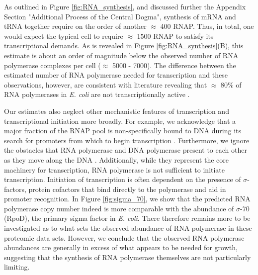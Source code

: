 As outlined in Figure \ref{fig:RNA_synthesis}, and discussed further the Appendix
Section "Additional Process of the Central Dogma", synthesis of mRNA and tRNA together require
on the order of another $\approx$ 400 RNAP. Thus, in total, one would expect the
typical cell to require $\approx$ 1500 RNAP to satisfy its transcriptional
demands. As is revealed in Figure \ref{fig:RNA_synthesis}(B), this estimate is about an
order of magnitude below the observed number of RNA polymerase complexes per
cell ($\approx$ 5000 - 7000). The difference between the estimated number of
RNA polymerase needed for transcription and these observations, however, are
consistent with literature revealing that $\approx$ 80\% of RNA
polymerases in \textit{E. coli} are not transcriptionally active
\citep{patrick2015}.

Our estimates also neglect other mechanistic features of transcription and
transcriptional initiation more broadly. For example, we acknowledge that a
major fraction of the RNAP pool is non-specifically bound to DNA during its
search for promoters from which to begin transcription \citep{klumpp2008}.
Furthermore, we ignore the obstacles that RNA polymerase and DNA polymerase
present to each other as they move along the DNA \citep{finkelstein2013}.
Additionally, while they represent the core machinery for transcription, RNA
polymerase is not sufficient to initiate transcription. Initiation of
transcription is often dependent on the presence of $\sigma$-factors, protein
cofactors that bind directly to the polymerase \citep{browning2016} and aid in
promoter recognition. In Figure \ref{fig:sigma_70}, we show that the
predicted RNA polymerase copy number indeed is more comparable with the
abundance of $\sigma$-70 (RpoD), the primary sigma factor in \textit{E. coli}.
There therefore remains more to be investigated as to what sets the observed
abundance of RNA polymerase in these proteomic data sets. However, we conclude
that the observed RNA polymerase abundances are generally in excess of what
appears to be needed for growth, suggesting that the synthesis of RNA polymerase
themselves are not particularly limiting.

